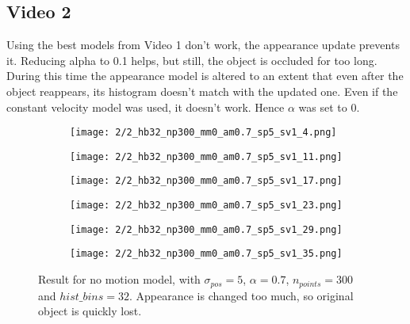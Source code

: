 \documentclass[10pt,a4paper,twoside]{article}
\newcommand{\sweepsize}{0.26}
\begin{document}
\subsection{Video 2}

Using the best models from Video 1 don't work, the appearance update
prevents it. Reducing alpha to 0.1 helps, but still, the object is occluded for too
long. During this time the appearance model is altered to an extent that even
after the object reappears, its histogram doesn't match with the updated one.
Even if the constant velocity model was used, it doesn't work. Hence $\alpha$
was set to 0.

\begin{figure}[h]
    \centering
    \begin{subfigure}{\sweepsize\textwidth}
    \texttt{[image: 2/2\_hb32\_np300\_mm0\_am0.7\_sp5\_sv1\_4.png]} 
    \end{subfigure}
    \begin{subfigure}{\sweepsize\textwidth}
    \texttt{[image: 2/2\_hb32\_np300\_mm0\_am0.7\_sp5\_sv1\_11.png]} 
    \end{subfigure}
    \begin{subfigure}{\sweepsize\textwidth}
    \texttt{[image: 2/2\_hb32\_np300\_mm0\_am0.7\_sp5\_sv1\_17.png]} 
    \end{subfigure}
    \begin{subfigure}{\sweepsize\textwidth}
    \texttt{[image: 2/2\_hb32\_np300\_mm0\_am0.7\_sp5\_sv1\_23.png]} 
    \end{subfigure}
    \begin{subfigure}{\sweepsize\textwidth}
    \texttt{[image: 2/2\_hb32\_np300\_mm0\_am0.7\_sp5\_sv1\_29.png]} 
    \end{subfigure}
    \begin{subfigure}{\sweepsize\textwidth}
    \texttt{[image: 2/2\_hb32\_np300\_mm0\_am0.7\_sp5\_sv1\_35.png]} 
    \end{subfigure}
    \caption{Result for no motion model, with $\sigma_{pos}=5$, $\alpha=0.7$, $n_{points}=300$
    and $hist\_bins=32$. Appearance is changed too much, so original object is quickly lost.}
\end{figure}
\end{document}
